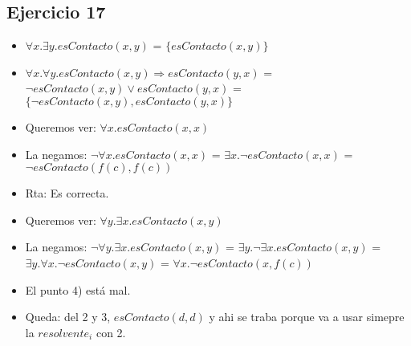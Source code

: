 \documentclass[10pt,a4paper]{article}
\begin{document}
  \subsection{Ejercicio 17}
\begin{itemize}
    \item $\forall x. \exists y. esContacto(x,y)$ = $\{esContacto(x,y)\}$
    \item $\forall x. \forall y. esContacto(x,y) \Rightarrow esContacto(y,x)$ = $\neg esContacto(x,y) \vee esContacto(y,x)$  = $\{\neg esContacto(x,y), esContacto(y,x)\}$ 
    \item Queremos ver: $\forall x. esContacto(x,x)$ 
    \item La negamos: $\neg \forall x. esContacto(x,x)$ = $\exists x. \neg esContacto(x,x)$ = $\neg esContacto(f(c),f(c))$
    \item Rta: Es correcta. \\ 
    \item Queremos ver: $\forall y. \exists x. esContacto(x,y)$ 
    \item La negamos: $\neg \forall y. \exists x. esContacto(x,y)$ = $\exists y. \neg \exists x. esContacto(x,y)$ = $\exists y. \forall x. \neg esContacto(x,y)$ = $\forall x. \neg esContacto(x,f(c))$  
    \item El punto 4) está mal. 
    \item Queda: del 2 y 3, $esContacto(d,d)$ y ahi se traba porque va a usar simepre la $resolvente_{i}$ con 2.
\end{itemize}
\end{document}
